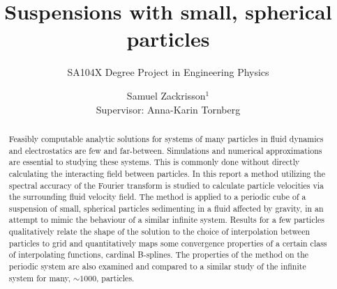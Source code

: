 \documentclass[a4paper,
twoside=false,abstract=false,numbers=noenddot,
titlepage=false,headings=small,parskip=half,version=last]{scrartcl}
\title{\vspace{15pt}Suspensions with small, spherical particles}
\subtitle{SA104X Degree Project in Engineering Physics}
\author[2]{Samuel Zackrisson$^1$ \\ \footnotesize Supervisor: Anna-Karin Tornberg}
\affil[2]{Numerical Analysis, Royal Institute of Technology (KTH)}
\affil[1]{samuelz@kth.se}
\affil[2]{akto@kth.se}
\begin{document}
\maketitle
\thispagestyle{fancy}

\begin{abstract}
Feasibly computable analytic solutions for systems of many particles in fluid dynamics and electrostatics are few and far-between.
Simulations and numerical approximations are essential to studying these systems.
This is commonly done without directly calculating the interacting field between particles.
In this report a method utilizing the spectral accuracy of the Fourier transform is studied to calculate particle velocities via the surrounding fluid velocity field.
The method is applied to a periodic cube of a suspension of small, spherical particles sedimenting in a fluid affected by gravity, in an attempt to mimic the behaviour of a similar infinite system.
Results for a few particles qualitatively relate the shape of the solution to the choice of interpolation between particles to grid and quantitatively maps some convergence properties of a certain class of interpolating functions, cardinal B-splines.
The properties of the method on the periodic system are also examined and compared to a similar study of the infinite system for many, $\sim 1000$, particles.
\end{abstract}

\pagebreak
\thispagestyle{empty}

\tableofcontents

\pagebreak

\end{document}
